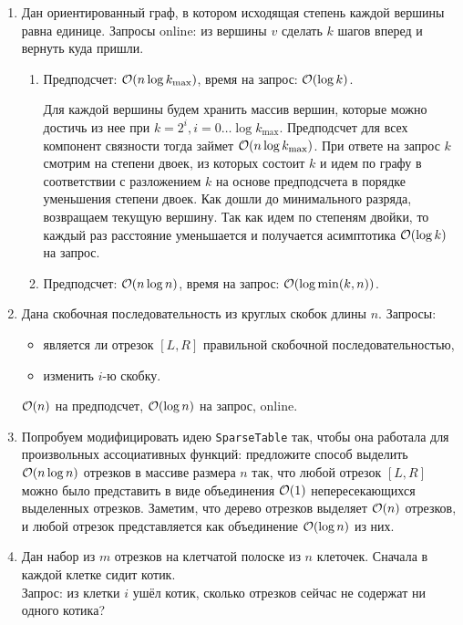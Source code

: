 \begin{enumerate}
  \item
    Дан ориентированный граф, в котором исходящая степень каждой вершины
	равна единице. Запросы online: из вершины $v$ сделать $k$ шагов вперед и вернуть куда пришли.
	\begin{enumerate}
	  \item Предподсчет: $\mathcal{O}(n \log k_{\max})$, время на запрос: $\mathcal{O}(\log k)$.
	  \begin{solution}
		Для каждой вершины будем хранить массив вершин, которые можно достичь из нее при $k=2^i, i = 0 \ldots \log k_{\max}$. Предподсчет для всех компонент связности тогда займет $\mathcal{O}(n \log k_{\max})$. При ответе на запрос $k$ смотрим на степени двоек, из которых состоит $k$ и идем по графу в соответствии с разложением $k$ на основе предподсчета в порядке уменьшения степени двоек. Как дошли до минимального разряда, возвращаем текущую вершину. Так как идем по степеням двойки, то каждый раз расстояние уменьшается и получается асимптотика $\mathcal{O}(\log k)$ на запрос.
	  \end{solution}
	  \item Предподсчет: $\mathcal{O}(n \log n)$, время на запрос: $\mathcal{O}(\log \min(k, n))$.      
	\end{enumerate}
	
  \item
	Дана скобочная последовательность из круглых скобок длины $n$. Запросы:
	\begin{itemize}
	    \item является ли отрезок $[L, R]$ правильной скобочной последовательностью,
	    \item изменить $i$-ю скобку.
	\end{itemize}
	$\mathcal{O}(n)$ на предподсчет, $\mathcal{O}(\log n)$ на запрос, online.

  \item
	Попробуем модифицировать идею \texttt{SparseTable} так, чтобы она работала для произвольных ассоциативных функций:
	предложите способ выделить $\mathcal{O}(n \log n)$ отрезков в массиве размера $n$ так, что любой
	отрезок $[L, R]$ можно было представить в виде объединения $\mathcal{O}(1)$ непересекающихся выделенных отрезков. 
	Заметим, что дерево отрезков выделяет $\mathcal{O}(n)$ отрезков, и любой отрезок
	представляется как объединение $\mathcal{O}(\log n)$ из них.

  \item
	Дан набор из $m$ отрезков на клетчатой полоске из $n$ клеточек. Сначала в каждой клетке сидит котик.\\
	Запрос: из клетки $i$ ушёл котик, сколько отрезков сейчас не содержат ни одного котика?


\end{enumerate}
